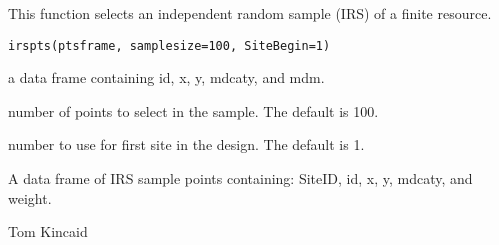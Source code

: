 \begin{Description}\relax
This function selects an independent random sample (IRS) of a finite resource.
\end{Description}
\begin{Usage}
\begin{verbatim}
irspts(ptsframe, samplesize=100, SiteBegin=1)
\end{verbatim}
\end{Usage}
\begin{Arguments}
\begin{ldescription}
\item[\code{ptsframe}] a data frame containing id, x, y, mdcaty, and mdm.
\item[\code{samplesize}] number of points to select in the sample.  The default is
100.
\item[\code{SiteBegin}] number to use for first site in the design.  The default is
1.
\end{ldescription}
\end{Arguments}
\begin{Value}
A data frame of IRS sample points containing: SiteID, id, x, y, mdcaty,
and weight.
\end{Value}
\begin{Author}\relax
Tom Kincaid 
\end{Author}
\begin{SeeAlso}\relax
{}
\end{SeeAlso}

